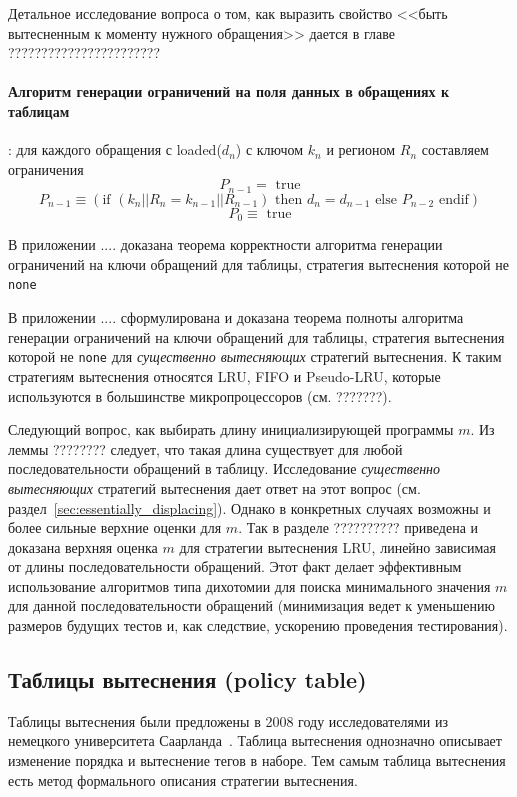 \documentclass[14pt]{extreport}
\newcommand{\LRU}{\textsf{LRU}\xspace}
\newcommand{\FIFO}{\textsf{FIFO}\xspace}
\newcommand{\PseudoLRU}{\textsf{Pseudo-LRU}\xspace}
\begin{document}
Детальное исследование вопроса о том, как выразить свойство <<быть вытесненным к
моменту нужного обращения>> дается в главе ???????????????????????

\paragraph{Алгоритм генерации ограничений на поля данных в обращениях к
таблицам}:
для каждого обращения с loaded($d_n$) с ключом $k_n$ и регионом $R_n$ составляем
ограничения
$$P_{n-1} = \mbox{~true}$$
$$P_{n-1} \equiv (\mbox{if~} (k_n||R_n = k_{n-1}||R_{n-1}) \mbox{~then~} d_n =
d_{n-1} \mbox{~else~} P_{n-2} \mbox{~endif})$$
$$P_0 \equiv \mbox{~true}$$

В приложении .... доказана теорема корректности алгоритма генерации ограничений
на ключи обращений для таблицы, стратегия вытеснения которой не \texttt{none}

В приложении .... сформулирована и доказана теорема полноты алгоритма генерации
ограничений на ключи обращений для таблицы, стратегия вытеснения которой не
\texttt{none} для \emph{существенно вытесняющих} стратегий вытеснения. К таким
стратегиям вытеснения относятся \LRU, \FIFO и \PseudoLRU, которые используются в
большинстве микропроцессоров (см. ???????).

Следующий вопрос, как выбирать длину инициализирующей программы $m$. Из леммы
???????? следует, что такая длина существует для любой последовательности
обращений в таблицу. Исследование \emph{существенно вытесняющих} стратегий
вытеснения дает ответ на этот вопрос (см.
раздел~\ref{sec:essentially_displacing}). Однако в конкретных случаях возможны и
более сильные верхние оценки для $m$. Так в разделе ?????????? приведена и
доказана верхняя оценка $m$ для стратегии вытеснения \LRU, линейно зависимая от
длины последовательности обращений. Этот факт делает эффективным использование
алгоритмов типа дихотомии для поиска минимального значения $m$ для данной
последовательности обращений (минимизация ведет к уменьшению размеров будущих
тестов и, как следствие, ускорению проведения тестирования).

\subsection{Таблицы вытеснения (policy table)}

Таблицы вытеснения были предложены в 2008 году исследователями из немецкого
университета Саарланда~\cite{policy_tables}. Таблица вытеснения
однозначно описывает изменение порядка и вытеснение тегов в наборе. Тем самым
таблица вытеснения есть метод формального описания стратегии вытеснения.
\end{document}
